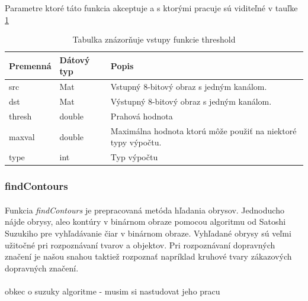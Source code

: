 \documentclass[12pt]{article}
\begin{document}
Parametre ktoré táto funkcia akceptuje a s ktorými pracuje sú viditeľné v tauľke \ref{thresholdPar}
\cite{bitwise_not_doc}
\cite{OpenCVDoc}
\begin{table}
	\centering
    \begin{tabular}{ | l | l | p{5cm} |}
    \hline
    Premenná & Dátový typ & Popis \\ \hline
    src & Mat & Vstupný 8-bitový obraz s jedným kanálom. \\ \hline
    dst & Mat & Výstupný 8-bitový obraz s jedným kanálom. \\ \hline
    thresh & double & Prahová hodnota \\ \hline
    maxval & double & Maximálna hodnota ktorú môže použiť na niektoré typy výpočtu. \\ \hline
    type & int & Typ výpočtu \\
    \hline
    \end{tabular}
  	\caption{Tabulka znázorňuje vstupy funkcie threshold}
  	\label{thresholdPar}
\end{table}
\subsubsection{findContours}
\paragraph{}
Funkcia \emph{findContours} je prepracovaná metóda hľadania obrysov. Jednoducho nájde obrysy, aleo kontúry v binárnom obraze pomocou algoritmu od Satoshi Suzukiho pre vyhľadávanie čiar v binárnom obraze.
Vyhľadané obrysy sú veľmi užitočné pri rozpoznávaní tvarov a objektov. Pri rozpoznávaní dopravných značení je našou snahou taktiež rozpoznať napríklad kruhové tvary zákazových dopravných značení.
\cite{findContours_doc}
\cite{OpenCVDoc}
\paragraph{}
obkec o suzuky algoritme - musim si nastudovat jeho pracu
\cite{suzuky}
\end{document}
